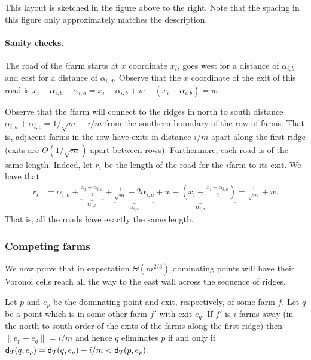 \documentclass[12pt]{article}
\newcommand{\pth}[2][\!]{#1\left({#2}\right)}
\newcommand{\west}{west\xspace}
\newcommand{\east}{east\xspace}
\newcommand{\seclab}[1]{\label{sec:#1}}
\newcommand{\obslab}[1]{\label{observation:#1}}
\newcommand{\Terrain}{\EuScript{T}}
\newcommand{\distGeo}[2]{\mathsf{d}_{\Terrain}\pth{#1,#2}}
\newcommand{\distX}[2]{\|#1-#2\|}
\begin{document}
This layout is sketched in the figure above to the right. Note that
the spacing in this figure only approximately matches the description.


\paragraph{Sanity checks.}
The road of the $i$\th farm starts at $x$ coordinate $x_i$, goes \west
for a distance of $\alpha_{i,b}$ and \east for a distance of
$\alpha_{i,d}$. Observe that the $x$ coordinate of the exit of this
road is $x_i - \alpha_{i,b} +\alpha_{i,d} = x_i -\alpha_{i,b} + w -
(x_i-\alpha_{i,b}) = w$.

Observe that the $i$\th farm will connect to the ridges in north to south
distance $\alpha_{i,a} + \alpha_{i,c} = 1/\sqrt{m}-i/m$ from the
southern boundary of the row of farms.  That is, adjacent farms in the row have
exits in distance $i/m$ apart along the first ridge (exits are
$\Theta\pth{1/\sqrt{m}}$ apart between rows).  Furthermore, each
road is of the same length. Indeed, let $r_i$ be the length of the
road for the $i$\th farm to its exit. We have that
\begin{align*}
    r_i &=\alpha_{i,a}+ \underbrace{\frac{{x_i + \alpha_{i,a}}}{2}}_{\alpha_{i,b}}+ \underbrace{\frac{1}{\sqrt{m}} - 2\alpha_{i,a}}_{\alpha_{i,c}} + \underbrace{w - \pth{x_i-\frac{{x_i +
                \alpha_{i,a}}}{2}}}_{\alpha_{i,d}}=\frac{1}{\sqrt{m}} + w.
\end{align*}
That is, all the roads have exactly the same length.


\subsubsection{Competing farms}
\seclab{ideal}

We now prove that in expectation $\Theta\pth{m^{2/3}}$ dominating
points will have their Voronoi cells reach all the way to the \east
wall across the sequence of ridges.

\begin{observation}
    Let $p$ and $e_p$ be the dominating point and exit, respectively,
    of some farm $f$.  Let $q$ be a point which is in some other farm
    $f'$ with exit $e_q$.  If $f'$ is $i$ farms away (in the north 
    to south order of the exits of the farms along the first ridge) then
    $\distX{e_p}{e_q} = i/m$ and hence $q$ eliminates $p$ if and only if
    $\distGeo{q}{e_p} = \distGeo{q}{e_q} + i/m < \distGeo{p}{e_p}$.
    
    \obslab{ifarms}
\end{observation}
\end{document}
